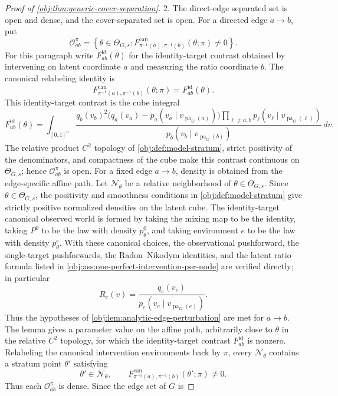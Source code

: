 \begin{proof}[Proof of \cref{obj:thm:generic-cover-separation}]
2.  The direct-edge separated set is open and dense, and the cover-separated set
is open.  For a directed edge \(a\to b\), put
\[
\mathcal O^\pi_{ab}
=
\left\{
\theta\in\Theta_{G,s}:
F^{\mathrm{can}}_{\pi^{-1}(a),\pi^{-1}(b)}(\theta;\pi)\ne0
\right\}.
\]
For this paragraph write \(F^{\mathrm{id}}_{ab}(\theta)\) for the
identity-target contrast obtained by intervening on latent coordinate \(a\) and
measuring the ratio coordinate \(b\).  The canonical relabeling identity is
\[
F^{\mathrm{can}}_{\pi^{-1}(a),\pi^{-1}(b)}(\theta;\pi)
=
F^{\mathrm{id}}_{ab}(\theta).
\]
This identity-target contrast is the cube integral
\[
F^{\mathrm{id}}_{ab}(\theta)
=
\int_{[0,1]^n}
\frac{
q_b(v_b)^2\bigl(q_a(v_a)-p_a(v_a\mid v_{\operatorname{pa}_G(a)})\bigr)
\prod_{\ell\ne a,b}p_\ell(v_\ell\mid v_{\operatorname{pa}_G(\ell)})
}
{p_b(v_b\mid v_{\operatorname{pa}_G(b)})}
\,dv .
\]
The relative product \(C^2\) topology of \cref{obj:def:model-stratum},
strict positivity of the denominators, and compactness of the cube make this
contrast continuous on \(\Theta_{G,s}\); hence \(\mathcal O^\pi_{ab}\) is open.
For a fixed edge \(a\to b\), density is obtained from the edge-specific affine
path.  Let \(\mathcal N_\theta\) be a relative neighborhood of
\(\theta\in\Theta_{G,s}\).  Since \(\theta\in\Theta_{G,s}\), the positivity and smoothness conditions in
\cref{obj:def:model-stratum} give strictly positive normalized densities on the
latent cube.  The identity-target canonical observed world is formed by taking
the mixing map to be the identity, taking \(P^0\) to be the law with density
\(p^0_\theta\), and taking environment \(e\) to be the law with density
\(p^e_\theta\).  With these canonical choices, the observational pushforward,
the single-target pushforwards, the Radon--Nikodym identities, and the latent
ratio formula listed in \cref{obj:ass:one-perfect-intervention-per-node} are
verified directly; in particular
\[
R_e(v)=
\frac{q_e(v_e)}{p_e(v_e\mid v_{\operatorname{pa}_G(e)})}.
\]
Thus the hypotheses of \cref{obj:lem:analytic-edge-perturbation} are met for
\(a\to b\).  The lemma gives a parameter value on the affine path, arbitrarily
close to \(\theta\) in the relative \(C^2\) topology, for which the
identity-target contrast \(F^{\mathrm{id}}_{ab}\) is nonzero.  Relabeling the
canonical intervention environments back by \(\pi\), every \(\mathcal N_\theta\)
contains a stratum point \(\theta'\) satisfying
\[
\theta'\in\mathcal N_\theta,
\qquad
F^{\mathrm{can}}_{\pi^{-1}(a),\pi^{-1}(b)}(\theta';\pi)\ne0.
\]
Thus each \(\mathcal O^\pi_{ab}\) is dense.  Since the edge set of \(G\) is

\end{proof}

